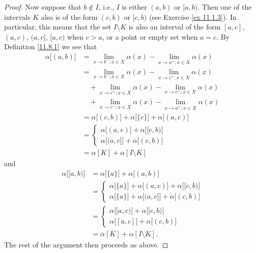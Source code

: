 \begin{proof}
    Now suppose that \(b \notin I\), i.e., \(I\) is either \((a, b)\) or \([a, b)\).
    Then one of the intervals \(K\) also is of the form \((c, b)\) or \([c, b)\) (see Exercise \ref{ex 11.1.3}).
            In particular, this means that the set \(I \setminus K\) is also an interval of the form \([a, c]\), \((a, c)\), \((a, c]\), \([a, c)\) when \(c > a\), or a point or empty set when \(a = c\).
    By Definition \ref{11.8.1} we see that
    \begin{align*}
        \alpha\big[(a, b)\big] & = \lim_{x \to b^- ; x \in X} \alpha(x) - \lim_{x \to a^+ ; x \in X} \alpha(x)       \\
                               & = \lim_{x \to b^- ; x \in X} \alpha(x) - \lim_{x \to c^+ ; x \in X} \alpha(x)       \\
                               & \quad + \lim_{x \to c^+ ; x \in X} \alpha(x) - \lim_{x \to c^- ; x \in X} \alpha(x) \\
                               & \quad + \lim_{x \to c^- ; x \in X} \alpha(x) - \lim_{x \to a^+ ; x \in X} \alpha(x) \\
                               & = \alpha\big[(c, b)\big] + \alpha\big[\{c\}\big] + \alpha\big[(a, c)\big]           \\
                               & = \begin{cases}
            \alpha\big[(a, c)\big] + \alpha\big[[c, b)\big] \\
                \alpha\big[(a, c]\big] + \alpha\big[(c, b)\big]
        \end{cases}                                                        \\
                               & = \alpha[K] + \alpha[I \setminus K]
    \end{align*}
    and
    \begin{align*}
        \alpha\big[[a, b)\big] & = \alpha\big[\{a\}\big] + \alpha\big[(a, b)\big] \\
                               & = \begin{cases}
            \alpha\big[\{a\}\big] + \alpha\big[(a, c)\big] + \alpha\big[[c, b)\big] \\
                \alpha\big[\{a\}\big] + \alpha\big[(a, c]\big] + \alpha\big[(c, b)\big]
        \end{cases}                     \\
                               & = \begin{cases}
            \alpha\big[[a, c)\big] + \alpha\big[[c, b)\big] \\
            \alpha\big[[a, c]\big] + \alpha\big[(c, b)\big]
        \end{cases}                     \\
                               & = \alpha[K] + \alpha[I \setminus K].
    \end{align*}
    The rest of the argument then proceeds as above.
\end{proof}

